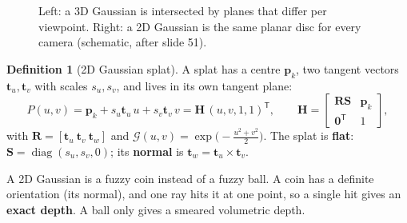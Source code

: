 \documentclass[11pt,a4paper]{article}
\newcommand{\G}{\mathcal{G}}
\newcommand{\T}{^{\mathsf T}}
\DeclareMathOperator{\diag}{diag}
\theoremstyle{definition}
\newtheorem{definition}{Definition}[section]
\theoremstyle{algstyle}
\theoremstyle{plain}
\theoremstyle{remark}
\newcommand{\blob}[6]{\begin{scope}[shift={(#1,#2)},rotate=#5]
  \shade[inner color=#6,outer color=#6!4] (0,0) ellipse (#3 and #4);\end{scope}}
\begin{document}
\begin{figure}[htbp]
\centering
{}
\caption{Left: a 3D Gaussian is intersected by planes that differ per viewpoint. Right: a 2D Gaussian is the same planar disc for every camera (schematic, after slide 51).}
\end{figure}

\begin{definition}[2D Gaussian splat]
A splat has a centre $\bm p_k$, two tangent vectors $\bm t_u,\bm t_v$ with scales $s_u,s_v$, and lives in its own tangent plane:
\[
P(u,v)=\bm p_k+s_u\bm t_u\,u+s_v\bm t_v\,v=\bm H\,(u,v,1,1)\T,\qquad
\bm H=\begin{bmatrix}\bm R\bm S&\bm p_k\\\bm 0\T&1\end{bmatrix},
\]
with $\bm R=[\bm t_u\ \bm t_v\ \bm t_w]$ and $\G(u,v)=\exp\!\big(-\tfrac{u^2+v^2}{2}\big)$. The splat is \textbf{flat}: $\bm S=\diag(s_u,s_v,0)$; its \textbf{normal} is $\bm t_w=\bm t_u\times\bm t_v$.
\end{definition}

\begin{intuition}
A 2D Gaussian is a fuzzy coin instead of a fuzzy ball. A coin has a definite orientation (its normal), and one ray hits it at one point, so a single hit gives an \textbf{exact depth}. A ball only gives a smeared volumetric depth.
\end{intuition}
\end{document}
